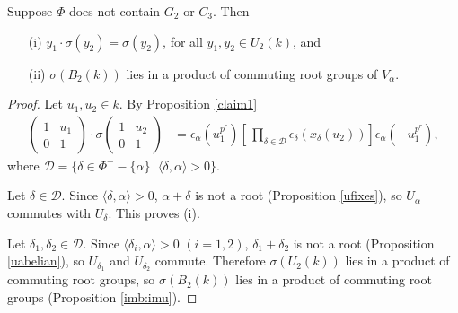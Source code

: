 \begin{lemma}\label{lem:first} Suppose $\Phi$ does not contain $G_2$ or $C_3$. Then
\begin{itemize}
\item[(i)] $y_1 \cdot \sigma(y_2) = \sigma(y_2)$, for all $y_1, y_2\in U_2(k)$, and
\item[(ii)] $\sigma\left(B_2(k)\right)$ lies in a product of commuting root groups of $V_\alpha$.
\end{itemize}
\end{lemma}
\begin{proof}
Let $u_1,u_2 \in k$. By Proposition \ref{claim1}
\begin{align*}
\left(\begin{matrix}1 & u_1 \\ 0 & 1 \end{matrix}\right)
\cdot
\sigma\left(\begin{matrix} 1 & u_2 \\ 0 & 1\end{matrix}\right)
&=
\epsilon_\alpha(u_1^{p^r}) \left[\,\prod_{\delta\in\mathcal{D}} \epsilon_\delta\left(x_\delta\left(u_2\right)\right)\right] \epsilon_\alpha(-u_1^{p^r}),
\end{align*}
where $\mathcal{D}=\{\delta \in \Phi^+ -\{\alpha\} \,|\,\langle \delta, \alpha \rangle > 0\}$.

Let $\delta \in \mathcal{D}$. Since $\langle \delta, \alpha \rangle > 0$, $\alpha + \delta$ is not a root (Proposition \ref{ufixes}), so $U_\alpha$ commutes with $U_\delta$. This proves (i).

Let $\delta_1, \delta_2 \in \mathcal{D}$. Since $\langle \delta_i, \alpha \rangle > 0$ $(i=1,2)$, $\delta_1 + \delta_2$ is not a root (Proposition \ref{uabelian}), so $U_{\delta_1}$ and $U_{\delta_2}$ commute. Therefore $\sigma\left(U_2(k)\right)$ lies in a product of commuting root groups, so $\sigma\left(B_2(k)\right)$ lies in a product of commuting root groups (Proposition \ref{imb:imu}).
\end{proof}

